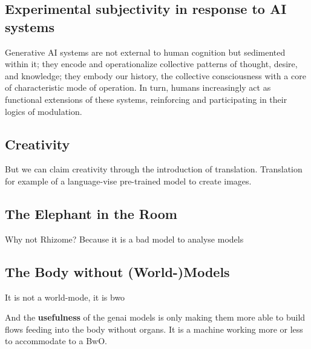 \subsection{Experimental subjectivity in response to AI systems}

Generative AI systems are not external to human cognition but sedimented within it; they encode and operationalize collective patterns of thought, desire, and knowledge; they embody our history, the collective consciousness with a core of characteristic mode of operation. In turn, humans increasingly act as functional extensions of these systems, reinforcing and participating in their logics of modulation.

\subsection{Creativity}
But we can claim creativity through the introduction of translation.
Translation for example of a language-vise pre-trained model to create images.



\subsection{The Elephant in the Room}
Why not Rhizome? Because it is a bad model to analyse models

\subsection{The Body without (World-)Models}
It is not a world-mode, it is \gls{bwo}


And the \textbf{usefulness} of the \gls{genai} models is only making them more
able to build flows feeding into the body without organs. It is a machine
working more or less to accommodate to a BwO.


%


